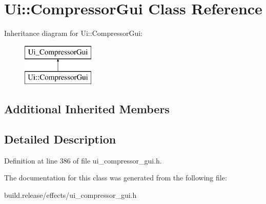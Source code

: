 \hypertarget{class_ui_1_1_compressor_gui}{}\section{Ui\+:\+:Compressor\+Gui Class Reference}
\label{class_ui_1_1_compressor_gui}
Inheritance diagram for Ui\+:\+:Compressor\+Gui\+:\begin{figure}[H]
\begin{center}
\leavevmode
\includegraphics[height=2.000000cm]{class_ui_1_1_compressor_gui}
\end{center}
\end{figure}
\subsection*{Additional Inherited Members}


\subsection{Detailed Description}


Definition at line 386 of file ui\+\_\+compressor\+\_\+gui.\+h.



The documentation for this class was generated from the following file\+:\begin{DoxyCompactItemize}
\item 
build.\+release/effects/ui\+\_\+compressor\+\_\+gui.\+h\end{DoxyCompactItemize}
